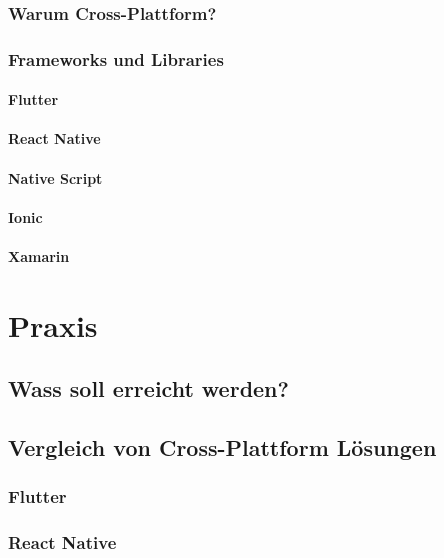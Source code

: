 \documentclass[a4paper]{scrartcl}
\begin{document}
\subsubsection{Warum Cross-Plattform?}

\subsubsection{Frameworks und Libraries}

\paragraph{Flutter}

\paragraph{React Native}

\paragraph{Native Script}

\paragraph{Ionic}

\paragraph{Xamarin}

\section{Praxis}

\subsection{Wass soll erreicht werden?}

\subsection{Vergleich von Cross-Plattform Lösungen}

\subsubsection{Flutter}

\subsubsection{React Native}
\end{document}
